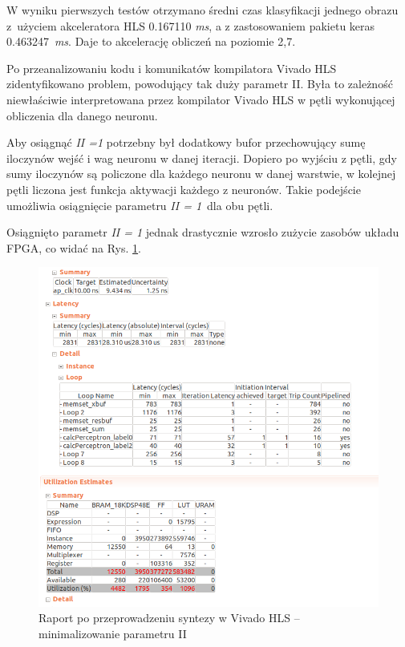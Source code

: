 W wyniku pierwszych testów otrzymano średni czas klasyfikacji jednego obrazu z~użyciem akceleratora HLS 
0.167110 \emph{ms}, a z zastosowaniem pakietu keras 0.463247~\emph{ms}. Daje to akcelerację obliczeń na 
poziomie 2,7.

Po przeanalizowaniu kodu i komunikatów kompilatora Vivado HLS zidentyfikowano problem, powodujący tak duży parametr II. Była to zależność niewłaściwie interpretowana przez kompilator Vivado HLS w pętli wykonującej obliczenia dla danego neuronu.

Aby osiągnąć \emph{II =1} potrzebny był dodatkowy bufor przechowujący sumę iloczynów wejść i wag neuronu w danej iteracji. Dopiero po wyjściu z pętli, gdy sumy iloczynów są policzone dla każdego neuronu w danej warstwie, w kolejnej pętli liczona jest funkcja aktywacji każdego z neuronów. Takie podejście umożliwia osiągnięcie parametru \emph{II = 1}~dla obu pętli.

Osiągnięto parametr \emph{II = 1} jednak drastycznie wzrosło zużycie zasobów układu FPGA, co widać na Rys. \ref{hls-report3}.

\begin{figure}[!h]
  \centering
  \includegraphics[width=\textwidth]{img/hls-report3.png}
  \caption{Raport po przeprowadzeniu syntezy w Vivado HLS -- minimalizowanie parametru II}
  \label{hls-report3}
\end{figure}

